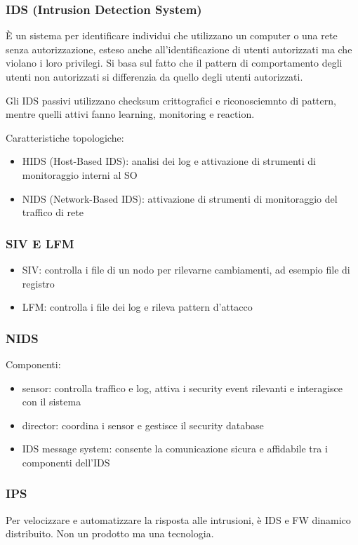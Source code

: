 \documentclass[11pt]{article}
\begin{document}
\subsubsection{IDS (Intrusion Detection System)}
È un sistema per identificare individui che utilizzano un computer o una rete senza autorizzazione, esteso anche all'identificazione 
di utenti autorizzati ma che violano i loro privilegi. Si basa sul fatto che il pattern di comportamento degli utenti non
autorizzati si differenzia da quello degli utenti autorizzati.

Gli IDS passivi utilizzano checksum crittografici e riconosciemnto di pattern, mentre quelli attivi fanno learning, monitoring 
e reaction.

Caratteristiche topologiche:
\begin{itemize}
    \item HIDS (Host-Based IDS): analisi dei log e attivazione di strumenti di monitoraggio interni al SO
    \item NIDS (Network-Based IDS): attivazione di strumenti di monitoraggio del traffico di rete 
\end{itemize}
\subsubsection{SIV E LFM}
\begin{itemize}
    \item SIV: controlla i file di un nodo per rilevarne cambiamenti, ad esempio file di registro
    \item LFM: controlla i file dei log e rileva pattern d'attacco 
\end{itemize}
\subsubsection{NIDS}
Componenti: 
\begin{itemize}
    \item sensor: controlla traffico e log, attiva i security event rilevanti e interagisce con il sistema 
    \item director: coordina i sensor e gestisce il security database 
    \item IDS message system: consente la comunicazione sicura e affidabile tra i componenti dell'IDS
\end{itemize}
\subsubsection{IPS}
Per velocizzare e automatizzare la risposta alle intrusioni, è IDS e FW dinamico distribuito. Non un prodotto ma una tecnologia.
\end{document}
